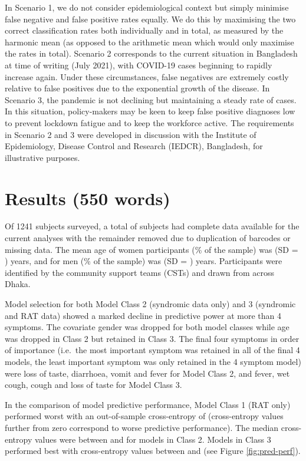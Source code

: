 \documentclass[]{elsarticle} %
\begin{document}
In Scenario 1, we do not consider epidemiological context but simply minimise false negative and false positive rates equally.
We do this by maximising the two correct classification rates both individually and in total, as measured by the harmonic mean (as opposed to the arithmetic mean which would only maximise the rates in total).
Scenario 2 corresponds to the current situation in Bangladesh at time of writing (July 2021), with COVID-19 cases beginning to rapidly increase again.
Under these circumstances, false negatives are extremely costly relative to false positives due to the exponential growth of the disease.
In Scenario 3, the pandemic is not declining but maintaining a steady rate of cases.
In this situation, policy-makers may be keen to keep false positive diagnoses low to prevent lockdown fatigue and to keep the workforce active.
The requirements in Scenario 2 and 3 were developed in discussion with the Institute of Epidemiology, Disease Control and Research (IEDCR), Bangladesh, for illustrative purposes.

\hypertarget{results-550-words}{%
\section{Results (550 words)}\label{results-550-words}}

Of 1241 subjects surveyed, a total of  subjects had complete data available for the current analyses with the remainder removed due to duplication of barcodes or missing data.
The mean age of women participants (\% of the sample) was  (SD = ) years, and for men (\% of the sample) was  (SD = ) years.
Participants were identified by the community support teams (CSTs) and drawn from across Dhaka.

Model selection for both Model Class 2 (syndromic data only) and 3 (syndromic and RAT data) showed a marked decline in predictive power at more than 4 symptoms.
The covariate gender was dropped for both model classes while age was dropped in Class 2 but retained in Class 3.
The final four symptoms in order of importance (i.e.~the most important symptom was retained in all of the final 4 models, the least important symptom was only retained in the 4 symptom model) were loss of taste, diarrhoea, vomit and fever for Model Class 2, and fever, wet cough, cough and loss of taste for Model Class 3.

In the comparison of model predictive performance, Model Class 1 (RAT only) performed worst with an out-of-sample cross-entropy of  (cross-entropy values further from zero correspond to worse predictive performance).
The median cross-entropy values were between  and  for models in Class 2.
Models in Class 3 performed best with cross-entropy values between  and  (see Figure \ref{fig:pred-perf}).
\end{document}
